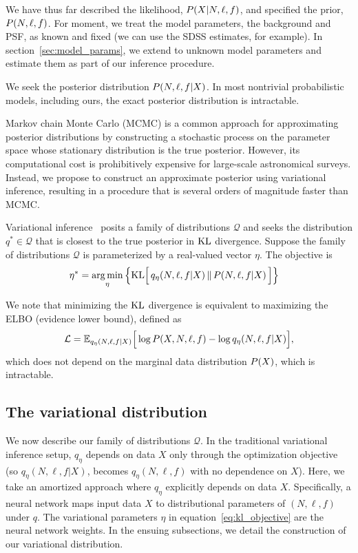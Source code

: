 We have thus far described the likelihood,
$P(X | N, \ell, f)$, and specified the prior, $P(N, \ell, f)$. 
For moment, we treat the model parameters, the background and PSF, as known and fixed
(we can use the SDSS estimates, for example). In section~\ref{sec:model_params}, we extend to unknown 
model parameters and estimate them as part of our inference procedure. 

We seek the posterior distribution 
$P(N, \ell, f | X)$. In most nontrivial probabilistic models, including ours, the exact posterior distribution is intractable.

Markov chain Monte Carlo (MCMC) is a common approach for approximating
posterior distributions by constructing a stochastic process on the parameter space whose stationary distribution is the true posterior. 
However, its computational cost is prohibitively expensive for
large-scale astronomical surveys. Instead, we propose to construct an approximate posterior using variational inference, resulting in a procedure that is several orders of magnitude faster than MCMC.

Variational inference~\cite{Blei_2017_vi_review, Jordan_intro_vi, Wainwrite_graph_models_vi}
posits a family of distributions $\mathcal{Q}$ and seeks
the distribution $q^*\in \mathcal{Q}$ that is closest to the true posterior
in $\textrm{KL}$ divergence. Suppose the family of distributions $\mathcal{Q}$ is parameterized by a real-valued vector $\eta$. The objective is 
\begin{align}
   \eta^* &= \operatorname*{arg\,min}_{\eta} \Big\{ \mathrm{KL}\Big[\,q_\eta(N, \ell, f | X)\, \| \,P(N, \ell, f | X )\,\Big]\Big\} 
   \label{eq:kl_objective}
\end{align}

We note that minimizing the $\textrm{KL}$ divergence is equivalent to maximizing the ELBO (evidence lower bound), defined as 
\begin{align}
    \mathcal{L} = 
    \mathbb{E}_{q_\eta(N, \ell, f | X)}\Big[\log P(X, N, \ell, f) - \log q_\eta(N, \ell, f | X)\Big],
    \label{eq:elbo}
\end{align}
which does not depend on the marginal data distribution $P(X)$, which is intractable. 

\subsection{The variational distribution}
We now describe our family of distributions $\mathcal{Q}$. 
In the traditional variational inference setup, 
$q_\eta$ depends on data $X$ only through the optimization objective 
(so $q_\eta(N, \ell, f | X)$,
becomes $q_\eta(N, \ell, f)$ with no dependence on $X$). 
Here, we take an amortized approach where
$q_\eta$ explicitly depends on data $X$. Specifically, a neural network 
maps input data $X$ to distributional parameters of $(N, \ell, f)$ 
under $q$. The variational parameters $\eta$ in equation~\eqref{eq:kl_objective} 
are the neural network weights. 
In the ensuing subsections, we detail the construction of our variational distribution. 


